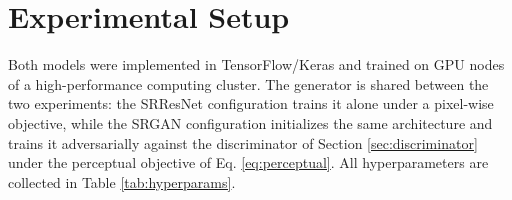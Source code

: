 \documentclass[conference]{IEEEtran}
\begin{document}

\section{Experimental Setup}
\label{sec:setup}
Both models were implemented in TensorFlow/Keras and trained on GPU nodes of a high-performance computing cluster. The generator is shared between the two experiments: the SRResNet configuration trains it alone under a pixel-wise objective, while the SRGAN configuration initializes the same architecture and trains it adversarially against the discriminator of Section \ref{sec:discriminator} under the perceptual objective of Eq. \eqref{eq:perceptual}. All hyperparameters are collected in Table \ref{tab:hyperparams}.
\end{document}
